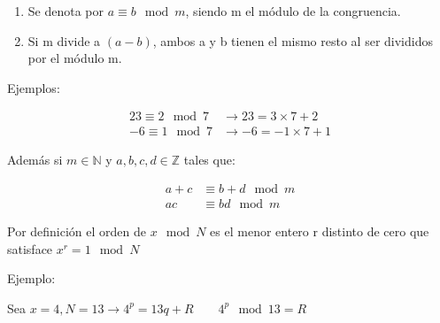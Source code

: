\begin{enumerate}
    \item Se denota por $a \equiv b \mod m$, siendo m el módulo de la congruencia.
    \item Si m divide a $(a-b)$, ambos a y b tienen el mismo resto al ser divididos por el módulo m.
\end{enumerate}

 Ejemplos:

\begin{align*}
    23 \equiv 2 \mod 7 &\rightarrow 23 = 3 \times 7 + 2 \\
    -6 \equiv 1 \mod 7 &\rightarrow -6 = -1 \times 7 +1
\end{align*}

 Además si $m \in \mathds{N}$ y $a,b,c,d \in \mathds{Z}$ tales que:

\begin{align*}
    a+c &\equiv b+d \mod m \\
    a c &\equiv b d \mod m
\end{align*}

 Por definición el orden de $x \mod N$ es el menor entero r distinto de cero que satisface $x^r = 1 \mod N$
 
Ejemplo:

 Sea $x = 4, N = 13 \rightarrow 4^p = 13 q + R \qquad 4^p \mod 13 = R$

